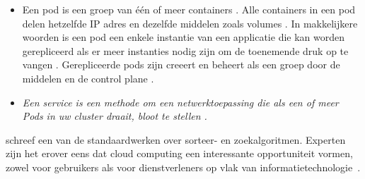 \begin{itemize}
    \item Een pod is een groep van één of meer containers \autocite{habbal-2020}. Alle containers in een pod delen hetzelfde IP adres en dezelfde middelen zoals volumes \textcite{hohn-2020}. In makkelijkere woorden is een pod een enkele instantie van een applicatie die kan worden gerepliceerd als er meer instanties nodig zijn om de toenemende druk op te vangen \textcite{habbal-2020}. Gerepliceerde pods zijn creeert en beheert als een groep door de middelen en de control plane \textcite{kubernetesDocs-2022}. 
    \item \textit{Een service is een methode om een netwerktoepassing die als een of meer Pods in uw cluster draait, bloot te stellen \autocite{kubernetesDocs-2022}.} 
\end{itemize}
 









\textcite{Knuth1998} schreef een van de standaardwerken over sorteer- en zoekalgoritmen. Experten zijn het erover eens dat cloud computing een interessante opportuniteit vormen, zowel voor gebruikers als voor dienstverleners op vlak van informatietechnologie~\autocite{Creeger2009}.

\lipsum[7-20]

